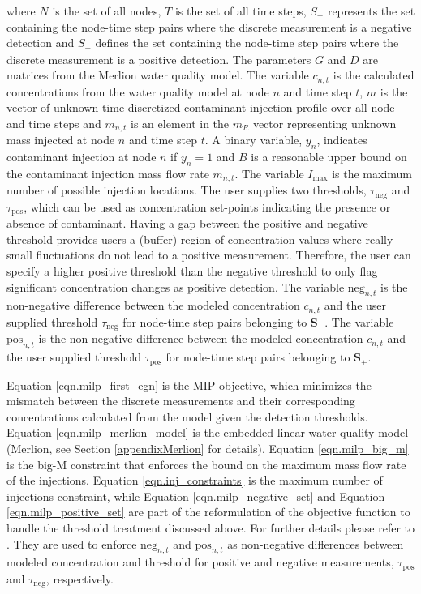 where $N$ is the set of all nodes, $T$ is the set of all time steps,
$S_-$ represents the set containing the node-time step pairs where the
discrete measurement is a negative detection and $S_+$ defines the set
containing the node-time step pairs where the discrete measurement is
a positive detection. The parameters $G$ and $D$ are matrices from
the Merlion water quality model. The variable $c_{n,t}$ is the
calculated concentrations from the water quality model at node $n$ and
time step $t$, $m$ is the vector of unknown time-discretized
contaminant injection profile over all node and time steps and
$m_{n,t}$ is an element in the $m_R$ vector representing unknown mass
injected at node $n$ and time step $t$. A binary variable, $y_n$,
indicates contaminant injection at node $n$ if $y_n{=}1$ and $B$ is a
reasonable upper bound on the contaminant injection mass flow rate
$m_{n,t}$. The variable $I_{\max}$ is the maximum number of possible
injection locations. The user supplies two thresholds, $\tau _\mathrm{neg}$
and $\tau _\mathrm{pos}$, which can be used as concentration set-points
indicating the presence or absence of contaminant. Having a gap
between the positive and negative threshold provides users a (buffer)
region of concentration values where really small fluctuations do not
lead to a positive measurement. Therefore, the user can specify a
higher positive threshold than the negative threshold to only flag
significant concentration changes as positive detection. The variable
$\mathrm{neg}_{n,t}$ is the non-negative difference between the modeled
concentration $c_{n,t}$ and the user supplied threshold $\tau _\mathrm{neg}$
for node-time step pairs belonging to $\mathbf{S}_-$. The variable
$\mathrm{pos}_{n,t}$ is the non-negative difference between the modeled
concentration $c_{n,t}$ and the user supplied threshold $\tau _\mathrm{pos}$
for node-time step pairs belonging to $\mathbf{S}_+$.


Equation \ref{eqn.milp_first_egn} is the MIP objective, which
minimizes the mismatch between the discrete measurements and their
corresponding concentrations calculated from the model given the
detection thresholds. Equation \ref{eqn.milp_merlion_model} is the
embedded linear water quality model (Merlion, see Section \ref{appendixMerlion} for details). 
Equation \ref{eqn.milp_big_m} is the big-M constraint
that enforces the bound on the maximum mass flow rate of the injections.
Equation \ref{eqn.inj_constraints} is the maximum number of injections constraint, while
Equation \ref{eqn.milp_negative_set} and Equation \ref{eqn.milp_positive_set} 
are part of the reformulation of the objective function to handle the 
threshold treatment discussed above. For further details please refer to \citet{Mann1}.
They are used to 
enforce $\mathrm{neg}_{n,t}$ and $\mathrm{pos}_{n,t}$ as non-negative differences between modeled concentration and 
threshold for positive and negative measurements, $\tau _\mathrm{pos}$ and $\tau _\mathrm{neg}$, respectively. 

